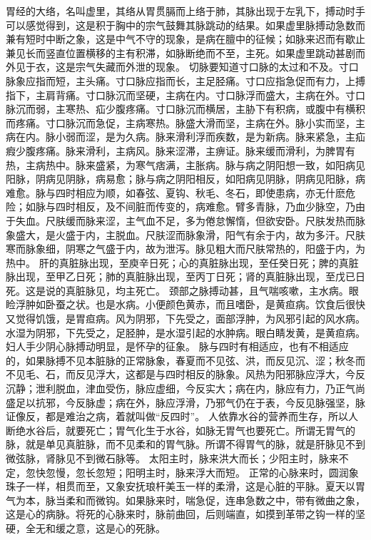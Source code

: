 \documentclass[a4paper,12pt,UTF8,twoside]{ctexbook}
\begin{document}
胃经的大络，名叫虚里，其络从胃贯膈而上络于肺，其脉出现于左乳下，搏动时手可以感觉得到，这是积于胸中的宗气鼓舞其脉跳动的结果。如果虚里脉搏动急数而兼有短时中断之象，这是中气不守的现象，是病在膻中的征候；如脉来迟而有歇止兼见长而竖直位置横移的主有积滞，如脉断绝而不至，主死。如果虚里跳动甚剧而外见于衣，这是宗气失藏而外泄的现象。
切脉要知道寸口脉的太过和不及。寸口脉象应指而短，主头痛。寸口脉应指而长，主足胫痛。寸口应指急促而有力，上搏指下，主肩背痛。寸口脉沉而坚硬，主病在内。寸口脉浮而盛大，主病在外。寸口脉沉而弱，主寒热、疝少腹疼痛。寸口脉沉而横居，主胁下有积病，或腹中有横积而疼痛。寸口脉沉而急促，主病寒热。脉盛大滑而坚，主病在外。脉小实而坚，主病在内。脉小弱而涩，是为久病。脉来滑利浮而疾数，是为新病。脉来紧急，主疝瘕少腹疼痛。脉来滑利，主病风。脉来涩滞，主痹证。脉来缓而滑利，为脾胃有热，主病热中。脉来盛紧，为寒气痞满，主胀病。脉与病之阴阳想一致，如阳病见阳脉，阴病见阴脉，病易愈；脉与病之阴阳相反，如阳病见阴脉，阴病见阳脉，病难愈。脉与四时相应为顺，如春弦、夏钩、秋毛、冬石，即使患病，亦无什麽危险；如脉与四时相反，及不间脏而传变的，病难愈。臂多青脉，乃血少脉空，乃由于失血。尺肤缓而脉来涩，主气血不足，多为倦怠懈惰，但欲安卧。尺肤发热而脉象盛大，是火盛于内，主脱血。尺肤涩而脉象滑，阳气有余于内，故为多汗。尺肤寒而脉象细，阴寒之气盛于内，故为泄泻。脉见粗大而尺肤常热的，阳盛于内，为热中。
肝的真脏脉出现，至庾辛日死；心的真脏脉出现，至任癸日死；脾的真脏脉出现，至甲乙日死；肺的真脏脉出现，至丙丁日死；肾的真脏脉出现，至戊已日死。这是说的真脏脉见，均主死亡。
颈部之脉搏动甚，且气喘咳嗽，主水病。眼睑浮肿如卧蚕之状。也是水病。小便颜色黄赤，而且嗜卧，是黄疸病。饮食后很快又觉得饥饿，是胃疸病。风为阴邪，下先受之，面部浮肿，为风邪引起的风水病。水湿为阴邪，下先受之，足胫肿，是水湿引起的水肿病。眼白睛发黄，是黄疸病。妇人手少阴心脉搏动明显，是怀孕的征象。
脉与四时有相适应，也有不相适应的，如果脉搏不见本脏脉的正常脉象，春夏而不见弦、洪，而反见沉、涩；秋冬而不见毛、石，而反见浮大，这都是与四时相反的脉象。风热为阳邪脉应浮大，今反沉静；泄利脱血，津血受伤，脉应虚细，今反实大；病在内，脉应有力，乃正气尚盛足以抗邪，今反脉虚；病在外，脉应浮滑，乃邪气仍在于表，今反见脉强坚，脉证像反，都是难治之病，着就叫做“反四时”。
人依靠水谷的营养而生存，所以人断绝水谷后，就要死亡；胃气化生于水谷，如脉无胃气也要死亡。所谓无胃气的脉，就是单见真脏脉，而不见柔和的胃气脉。所谓不得胃气的脉，就是肝脉见不到微弦脉，肾脉见不到微石脉等。
太阳主时，脉来洪大而长；少阳主时，脉来不定，忽快忽慢，忽长忽短；阳明主时，脉来浮大而短。
正常的心脉来时，圆润象珠子一样，相贯而至，又象安抚琅杆美玉一样的柔滑，这是心脏的平脉。夏天以胃气为本，脉当柔和而微钩。如果脉来时，喘急促，连串急数之中，带有微曲之象，这是心的病脉。将死的心脉来时，脉前曲回，后则端直，如摸到革带之钩一样的坚硬，全无和缓之意，这是心的死脉。
\end{document}
